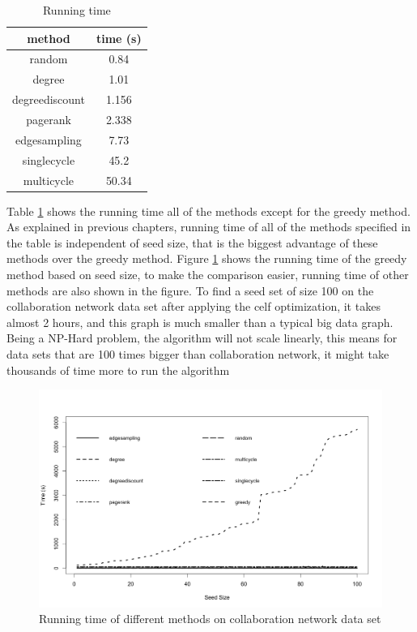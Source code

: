 \documentclass[english]{tktltiki}
\begin{document}
\begin{table}[ht!]
\centering
\begin{tabular}{ |c|c| }
\hline 
  method & time (s)\\
  \hline 
  random & 0.84\\
  degree & 1.01\\
  degreediscount&1.156\\
  pagerank&2.338\\
  edgesampling&7.73\\
  singlecycle&45.2\\
  multicycle&50.34\\
  \hline 
\end{tabular}
\caption{Running time}
\label{hep:timetable}
\end{table}
Table \ref{hep:timetable} shows the running time all of the methods except for the greedy method. As explained in previous chapters, running time of all of the methods specified in the table is independent of seed size, that is the biggest advantage of these methods over the greedy method. Figure \ref{hep:times} shows the running time of the greedy method based on seed size, to make the comparison easier, running time of other methods are also shown in the figure. To find a seed set of size 100 on the collaboration network data set after applying the celf optimization, it takes almost 2 hours, and this graph is much smaller than a typical big data graph. Being a NP-Hard problem, the algorithm will not scale linearly, this means for data sets that are 100 times bigger than collaboration network, it might take thousands of time more to run the algorithm
\begin{figure}[H]
\centering
\includegraphics[width=150mm]{figures/hep/times.png}
\caption{Running time of different methods on collaboration network data set}
\label{hep:times}
\end{figure}
\end{document}
